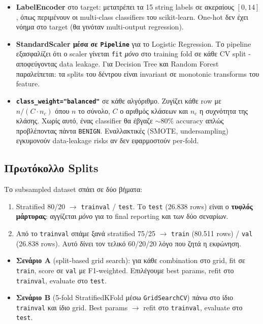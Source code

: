 \documentclass[12pt,a4paper,twoside]{book}
\begin{document}
\begin{itemize}
    \item \textbf{LabelEncoder} στο target: μετατρέπει τα 15 string
    labels σε ακεραίους \([0, 14]\), όπως περιμένουν οι multi-class
    classifiers του scikit-learn. One-hot δεν έχει νόημα στο target
    (θα γινόταν multi-output regression).
    \item \textbf{StandardScaler μέσα σε \texttt{Pipeline}} για το
    Logistic Regression. Το pipeline εξασφαλίζει ότι ο scaler γίνεται
    \texttt{fit} \emph{μόνο} στο training fold σε κάθε CV split -
    αποφεύγοντας data leakage. Για Decision Tree και Random Forest
    παραλείπεται: τα splits του δέντρου είναι invariant σε monotonic
    transforms του feature.
    \item \textbf{\texttt{class\_weight="balanced"}} σε κάθε αλγόριθμο.
    Ζυγίζει κάθε row με \(n/(C\cdot n_c)\) όπου \(n\) το σύνολο, \(C\)
    ο αριθμός κλάσεων και \(n_c\) η συχνότητα της κλάσης. Χωρίς αυτό,
    ένας classifier θα έβγαζε \(\sim 80\%\) accuracy απλώς
    προβλέποντας πάντα \texttt{BENIGN}. Εναλλακτικές (SMOTE,
    undersampling) εγκυμονούν data-leakage risks αν δεν εφαρμοστούν
    per-fold.
\end{itemize}

\subsection{Πρωτόκολλο Splits}

Το subsampled dataset σπάει σε δύο βήματα:
\begin{enumerate}
    \item Stratified 80/20 \(\to\) \texttt{trainval} / \texttt{test}.
    Το \texttt{test} (26.838 rows) είναι ο \textbf{τυφλός μάρτυρας}:
    αγγίζεται \emph{μόνο} για το final reporting και των δύο σεναρίων.
    \item Από το \texttt{trainval} σπάμε ξανά stratified 75/25 \(\to\)
    \texttt{train} (80.511 rows) / \texttt{val} (26.838 rows). Αυτό
    δίνει τον τελικό 60/20/20 λόγο που ζητά η εκφώνηση.
\end{enumerate}

\begin{itemize}
    \item \textbf{Σενάριο A} (split-based grid search): για κάθε
    combination στο grid, fit σε \texttt{train}, score σε
    \texttt{val} με F1-weighted. Επιλέγουμε best params, refit στο
    \texttt{trainval}, evaluate στο \texttt{test}.
    \item \textbf{Σενάριο B} (5-fold StratifiedKFold μέσω
    \texttt{GridSearchCV}) πάνω στο ίδιο \texttt{trainval} και ίδιο
    grid. Best params \(\to\) refit στο \texttt{trainval}, evaluate
    στο \texttt{test}.
\end{itemize}
\end{document}

